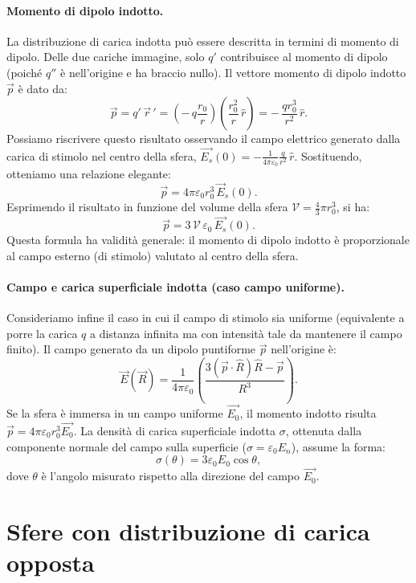 \documentclass{book}
\begin{document}
\paragraph{Momento di dipolo indotto.}
La distribuzione di carica indotta può essere descritta in termini di momento di dipolo. Delle due cariche immagine, solo \(q'\) contribuisce al momento di dipolo (poiché \(q''\) è nell'origine e ha braccio nullo).
Il vettore momento di dipolo indotto \(\vec{p}\) è dato da:
\[
\vec{p} = q'\, \vec{r}\,' = \left(-\,q\frac{r_0}{r}\right) \left(\frac{r_0^2}{r}\,\hat{r}\right)
= -\,\frac{q r_0^3}{r^2}\,\hat{r}.
\]
Possiamo riscrivere questo risultato osservando il campo elettrico generato dalla carica di stimolo nel centro della sfera, \(\vec{ E_s}(0)=-\frac{1}{4\pi\varepsilon_0}\frac{q}{r^2}\,\hat{ r}\). Sostituendo, otteniamo una relazione elegante:
\[
\vec{p} = 4\pi\varepsilon_0 r_0^3\,\vec{E}_s(0).
\]
Esprimendo il risultato in funzione del volume della sfera \(\mathcal{V}=\tfrac{4}{3}\pi r_0^3\), si ha:
\[
\vec{ p} = 3\,\mathcal{V}\,\varepsilon_0\,\vec{ E_s}(0).
\]
Questa formula ha validità generale: il momento di dipolo indotto è proporzionale al campo esterno (di stimolo) valutato al centro della sfera.

\paragraph{Campo e carica superficiale indotta (caso campo uniforme).}
Consideriamo infine il caso in cui il campo di stimolo sia uniforme (equivalente a porre la carica \(q\) a distanza infinita ma con intensità tale da mantenere il campo finito).
Il campo generato da un dipolo puntiforme \(\vec{p}\) nell'origine è:
\[
\vec {E}(\vec {R}) = \frac{1}{4\pi\varepsilon_0}\left(\frac{3(\vec{p} \cdot\hat{R })\hat{ R}-\vec{ p}}{R^3}\right).
\]
Se la sfera è immersa in un campo uniforme \(\vec{ E_0}\), il momento indotto risulta \(\vec{ p} = 4\pi\varepsilon_0 r_0^3\vec{ E_0}\).
La densità di carica superficiale indotta \(\sigma\), ottenuta dalla componente normale del campo sulla superficie (\(\sigma=\varepsilon_0 E_n\)), assume la forma:
\[
\sigma(\theta)=3\varepsilon_0 E_0\cos\theta,
\]
dove \(\theta\) è l'angolo misurato rispetto alla direzione del campo \(\vec{ E_0}\).

\section{Sfere con distribuzione di carica opposta}
\end{document}
